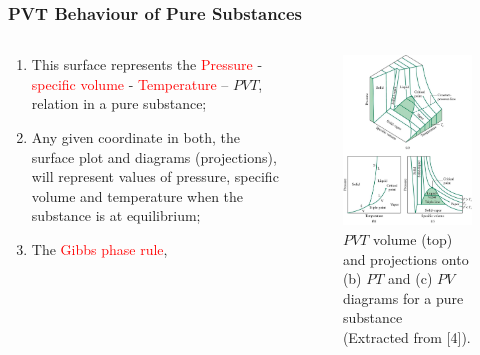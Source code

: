 \documentclass[10pt,compress]{beamer}
\begin{document}
\begin{frame}
 \frametitle{PVT Behaviour of Pure Substances}
 \begin{columns}
  \begin{column}[l]{0.5\linewidth}
    \begin{enumerate}\scriptsize
    \item <1-> This surface represents the \textcolor{red}{Pressure} - \textcolor{red}{specific volume} - \textcolor{red}{Temperature} -- $PVT$, relation in a pure substance;
    \item <2-> Any given coordinate in both, the surface plot and diagrams (projections), will represent values of pressure, specific volume and temperature when the substance is at equilibrium;
    \item <3-> The \textcolor{red}{Gibbs phase rule},
\end{enumerate}
  \end{column}
  \begin{column}[l]{0.5\linewidth}
   \begin{figure}%
    \begin{center}
     \includegraphics[width=4.cm,clip]{./../Pics/PVT_Surface.jpg}
    \end{center}
    \scriptsize\caption{\scriptsize$PVT$ volume (top) and projections onto (b) $PT$ and (c) $PV$ diagrams for a pure substance (Extracted from [4]).}
   \end{figure}    
  \end{column}
 \end{columns}
\end{frame}
\end{document}
